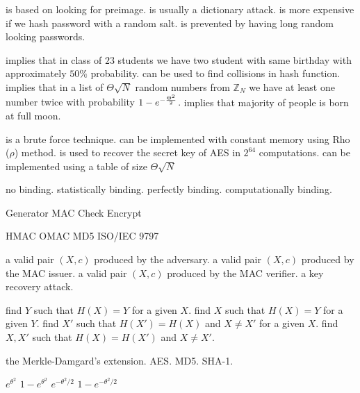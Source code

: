{is based on looking for preimage.}
{is usually a dictionary attack.}
{is more expensive if we hash password with a random salt.}
{is prevented by having long random looking passwords.}

{implies that in class of $23$ students we have two student with same birthday with approximately $50\%$ probability.}
{can be used to find collisions in hash function.}
{implies that in a list of $\Theta\sqrt{N}$ random numbers from $\mathbb{Z}_N$ we have at least one number twice with probability $1- e^{-{\Theta^2\over 2}}$.}
{implies that majority of people is born at full moon.}

{is a brute force technique.}
{can be implemented with constant memory using Rho ($\rho$) method.}
{is used to recover the secret key of AES in $2^{64}$ computations.}
{can be implemented using a table of size $\Theta\sqrt{N}$}

{no binding.}
{statistically binding.}
{perfectly binding.}
{computationally binding.}

{Generator}
{MAC}
{Check}
{Encrypt}

{HMAC}
{OMAC}
{MD5}
{ISO/IEC 9797}

{a valid pair $(X,c)$ produced by the adversary.}
{a valid pair $(X,c)$ produced by the MAC issuer.}
{a valid pair $(X,c)$ produced by the MAC verifier.}
{a key recovery attack.}

{find $Y$ such that $H(X)=Y$ for a given $X$.}
{find $X$ such that $H(X)=Y$ for a given $Y$.}
{find $X'$ such that $H(X')=H(X)$ and $X\ne X'$ for a given $X$.}
{find $X,X'$ such that $H(X)=H(X')$ and $X\ne X'$.}

{the Merkle-Damgard's extension.}
{AES.}
{MD5.}
{SHA-1.}

{$e^{\theta ^2}$}
{$1-e^{\theta ^2}$}
{$e^{-\theta ^2 /2}$}
{$1-e^{-\theta ^2 /2}$}

